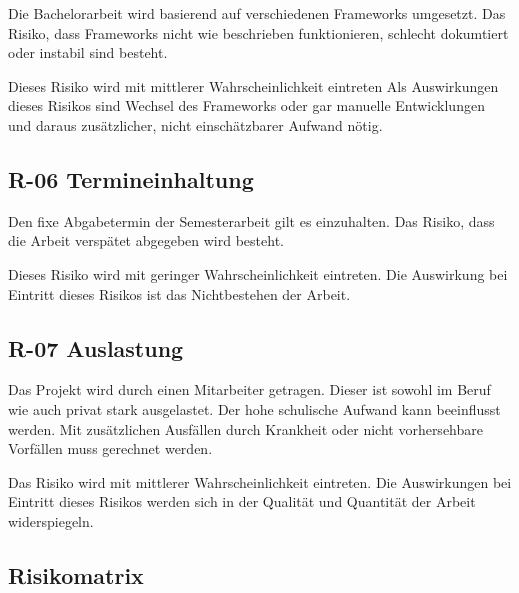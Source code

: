 Die Bachelorarbeit wird basierend auf verschiedenen Frameworks
umgesetzt. Das Risiko, dass Frameworks nicht wie beschrieben
funktionieren, schlecht dokumtiert oder instabil sind besteht.

Dieses Risiko wird mit mittlerer Wahrscheinlichkeit eintreten Als
Auswirkungen dieses Risikos sind Wechsel des Frameworks oder gar
manuelle Entwicklungen und daraus zusätzlicher, nicht einschätzbarer
Aufwand nötig.

\subsection{R-06 Termineinhaltung}\label{r-06-termineinhaltung}

Den fixe Abgabetermin der Semesterarbeit gilt es einzuhalten. Das
Risiko, dass die Arbeit verspätet abgegeben wird besteht.

Dieses Risiko wird mit geringer Wahrscheinlichkeit eintreten. Die
Auswirkung bei Eintritt dieses Risikos ist das Nichtbestehen der Arbeit.

\subsection{R-07 Auslastung}\label{r-07-auslastung}

Das Projekt wird durch einen Mitarbeiter getragen. Dieser ist sowohl im
Beruf wie auch privat stark ausgelastet. Der hohe schulische Aufwand
kann beeinflusst werden. Mit zusätzlichen Ausfällen durch Krankheit oder
nicht vorhersehbare Vorfällen muss gerechnet werden.

Das Risiko wird mit mittlerer Wahrscheinlichkeit eintreten. Die
Auswirkungen bei Eintritt dieses Risikos werden sich in der Qualität und
Quantität der Arbeit widerspiegeln.

\newpage

\subsection{Risikomatrix}\label{risikomatrix}

